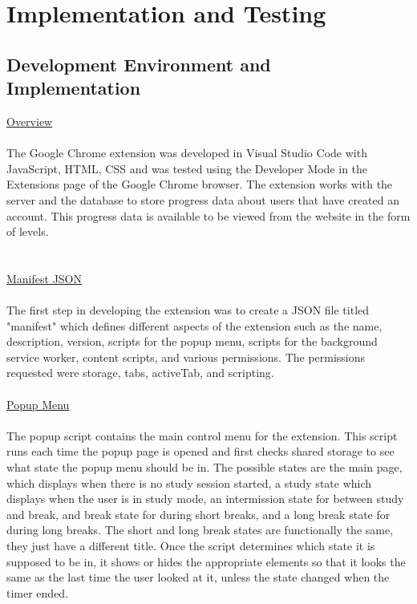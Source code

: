 \documentclass[12pt]{article}
\begin{document}
\section{Implementation and Testing}

\subsection{Development Environment and Implementation}
\noindent \underline{Overview} \\\\
\indent The Google Chrome extension was developed in Visual Studio Code with JavaScript, HTML, CSS
and was tested using the Developer Mode in the Extensions page of the Google Chrome browser. The extension works
with the server and the database to store progress data about users that have created an account. This progress data is
available to be viewed from the website in the form of levels.
\\\\\\
\underline{Manifest JSON}\\\\
\indent The first step in developing the extension was to create a JSON file titled "manifest" which
defines different aspects of the extension such as the name, description, version, scripts for the popup menu,
scripts for the background service worker, content scripts, and various permissions. The permissions requested were storage, tabs, activeTab, and scripting.
\\\\

\noindent \underline{Popup Menu} \\\\
\indent The popup script contains the main control menu for the extension. This script runs each time the popup page
is opened and first checks shared storage to see what state the popup menu should be in. The possible states
are the main page, which displays when there is no study session started, a study state which displays when
the user is in study mode, an intermission state for between study and break, and break state for during short breaks,
and a long break state for during long breaks. The short and long break states are functionally the same, they just
have a different title. Once the script determines which state it is supposed to be in, it shows or hides the
appropriate elements so that it looks the same as the last time the user looked at it, unless the state changed when the timer ended.\\
\end{document}
